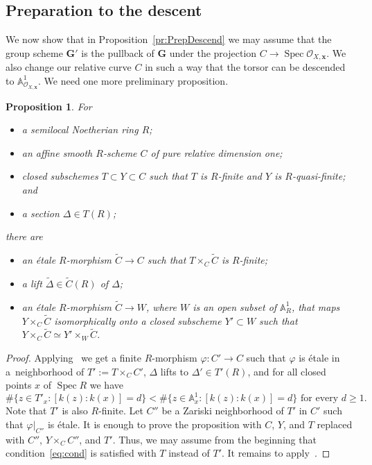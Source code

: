 \documentclass[11pt]{amsart}
\renewcommand{\phi}{\varphi}
\newcommand\A{\mathbb A}
\DeclareMathOperator\Spec{{Spec}}
\theoremstyle{plain}
\newtheorem{proposition}{Proposition}[section]
\theoremstyle{definition}
\theoremstyle{remark}
\newcommand\cO{{\mathcal{O}}}
\newcommand\bG{{\mathbf G}}
\newcommand\bx{{\mathbf x}}
\begin{document}
\subsection{Preparation to the descent} We now show that in Proposition~\ref{pr:PrepDescend} we may assume that the group scheme $\bG'$ is the pullback of $\bG$ under the projection $C\to\Spec\cO_{X,\bx}$. We also change our relative curve $C$ in such a way that the torsor can be descended to $\A^1_{\cO_{X,\bx}}$. We need one more preliminary proposition.

\begin{proposition}\label{pr:prepare0}
For
\begin{itemize}
  \item a semilocal Noetherian ring $R$;
  \item an affine smooth $R$-scheme $C$ of pure relative dimension one;
  \item closed subschemes $T\subset Y\subset C$ such that $T$ is $R$-finite and $Y$ is $R$-quasi-finite; and
  \item a section $\Delta\in T(R)$;
\end{itemize}
there are
\begin{itemize}
     \item an \'etale $R$-morphism $\widetilde C\to C$ such that $T\times_C\widetilde C$ is $R$-finite;
     \item a lift $\widetilde\Delta\in\widetilde C(R)$ of $\Delta$;
     \item an \'etale $R$-morphism $\widetilde C\to W$, where $W$ is an open subset of $\A^1_R$, that maps $Y\times_C\widetilde C$ isomorphically onto a closed subscheme $Y'\subset W$ such that $Y\times_C\widetilde C\simeq Y'\times_W\widetilde C$.
\end{itemize}
\end{proposition}
\begin{proof}
Applying~\cite[Lm.~6.1]{CesnaviciusGrSerre} we get a finite $R$-morphism $\phi\colon C'\to C$ such that $\phi$ is \'etale in a~neighborhood of $T':=T\times_CC'$, $\Delta$ lifts to $\Delta'\in T'(R)$, and for all closed points $x$ of $\Spec R$ we have
\begin{equation}\label{eq:cond}
    \#\{z\in T'_x\colon [k(z):k(x)]=d\}<\#\{z\in \A^1_x\colon [k(z):k(x)]=d\}\text{ for every }d\ge1.
\end{equation}
Note that $T'$ is also $R$-finite. Let $C''$ be a Zariski neighborhood of $T'$ in $C'$ such that $\phi|_{C''}$ is \'etale. It is enough to prove the proposition with $C$, $Y$, and $T$ replaced with $C''$, $Y\times_CC''$, and $T'$. Thus, we may assume from the beginning that condition~\eqref{eq:cond} is satisfied with $T$ instead of $T'$. It remains to apply~\cite[Variant~4.8]{GuoLiuGrSerre}.
\end{proof}
\end{document}
